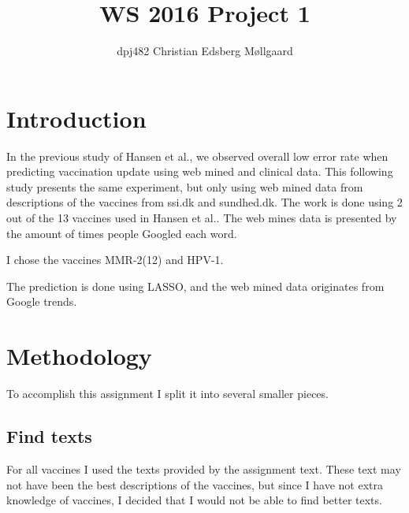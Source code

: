 \documentclass{sig-alternate}
\begin{document}
\title{WS 2016 Project 1}
\author{
\alignauthor 
dpj482 Christian Edsberg Møllgaard
}
\maketitle



\section{Introduction}
In the previous study of Hansen et al.\cite{H2016}, we observed overall low error rate when predicting vaccination update using web mined and clinical data. This following study presents the same experiment, but only using web mined data from descriptions of the vaccines from ssi.dk\cite{web1} and sundhed.dk\cite{web2}. The work is done using 2 out of the 13 vaccines used in Hansen et al.\cite{H2016}. The web mines data is presented by the amount of times people Googled each word.



I chose the vaccines MMR-2(12) and HPV-1.

The prediction is done using LASSO, and the web mined data originates from Google trends.\cite{trends}

\section{Methodology}
To accomplish this assignment I split it into several smaller pieces. 
\subsection*{Find texts}
For all vaccines I used the texts provided by the assignment text. These text may not have been the best descriptions of the vaccines, but since I have not extra knowledge of vaccines, I decided that I would not be able to find better texts. 
\end{document}

